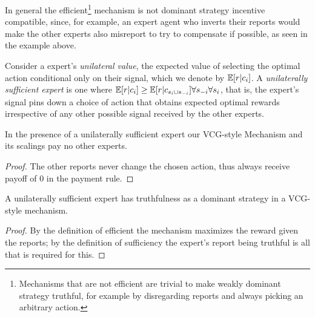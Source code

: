 In general the efficient\footnote{Mechanisms that are not efficient are trivial to make weakly dominant strategy truthful, for example by disregarding reports and always picking an arbitrary action.} mechanism is not dominant strategy incentive compatible, since, for example, an expert agent who inverts their reports would make the other experts also misreport to try to compensate if possible, as seen in the example above.

Consider a expert's \emph{unilateral value}, the expected value of selecting the optimal action conditional only on their signal, which we denote by  $\operatorname*{\mathbb E}[ r| c_{i}]$. A \emph{unilaterally sufficient expert} is one where $\operatorname*{\mathbb E}[r|c_{i}] \geq \operatorname*{\mathbb E}[r|c_{s_i \cup s_{-i}}] \forall s_{-i} \forall s_{i}$, that is, the expert's signal pins down a choice of action that obtains expected optimal rewards irrespective of any other possible signal received by the other experts.



\begin{lem}
	In the presence of a unilaterally sufficient expert our VCG-style Mechanism and its scalings pay no other experts.
\end{lem}

\begin{proof}
    The other reports never change the chosen action, thus always receive payoff of 0 in the payment rule.
\end{proof}


\begin{lem}
	A unilaterally sufficient expert has truthfulness as a dominant strategy in a VCG-style mechanism.
\end{lem}

\begin{proof}
    By the definition of efficient the mechanism maximizes the reward given the reports; by the definition of sufficiency the expert's report being truthful is all that is required for this.
\end{proof}


